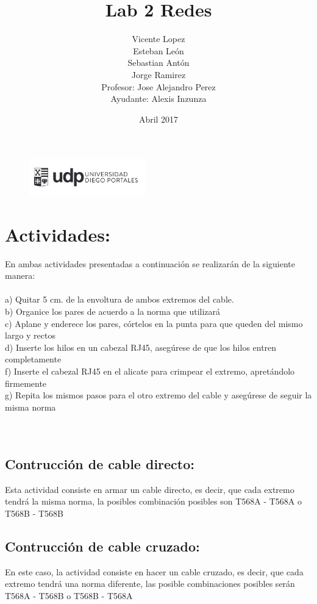 \documentclass{article}
\title{Lab 2 Redes}
\author{Vicente Lopez\\Esteban León\\Sebastian Antón\\Jorge Ramirez\\Profesor: Jose Alejandro Perez\\Ayudante: Alexis Inzunza}
\date{Abril 2017}
\begin{document}
\begin{figure}[h]
\includegraphics[width=0.45\textwidth]{logo_udp.png}
\maketitle
\end{figure}

\section{Actividades:}
En ambas actividades presentadas a continuación se realizarán de la siguiente manera:\\\\
a) Quitar 5 cm. de la envoltura de ambos extremos del cable.\\
b) Organice los pares de acuerdo a la norma que utilizará\\
c) Aplane y enderece los pares, córtelos en la punta para que queden del mismo largo y rectos\\
d) Inserte los hilos en un cabezal RJ45, asegúrese de que los hilos entren completamente\\
f) Inserte el cabezal RJ45 en el alicate para crimpear el extremo, apretándolo firmemente\\
g) Repita los mismos pasos para el otro extremo del cable y asegúrese de seguir la misma norma\\\\\\

\subsection{Contrucción de cable directo:}
Esta actividad consiste en armar un cable directo, es decir, que cada extremo tendrá la misma norma, la posibles combinación posibles son T568A - T568A o T568B - T568B\\

\subsection{Contrucción de cable cruzado:}
En este caso, la actividad consiste en hacer un cable cruzado, es decir, que cada extremo tendrá una norma diferente, las posible combinaciones posibles serán T568A - T568B o T568B - T568A\\
\end{document}
